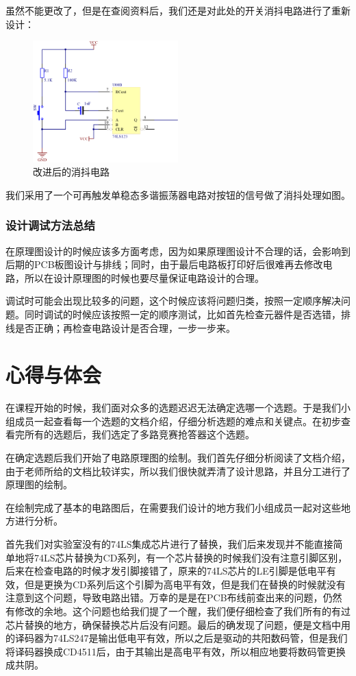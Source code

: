 \documentclass{../source/Experiment}
\begin{document}
            虽然不能更改了，但是在查阅资料后，我们还是对此处的开关消抖电路进行了重新设计：
            \begin{figure}[H]
                \centering
                \includegraphics[width = 0.5\textwidth]{pic/消抖.png}
                \caption{改进后的消抖电路}
            \end{figure}
            我们采用了一个可再触发单稳态多谐振荡器电路对按钮的信号做了消抖处理如图。
            \subsubsection{设计调试方法总结}
            在原理图设计的时候应该多方面考虑，因为如果原理图设计不合理的话，会影响到后期的PCB板图设计与排线；同时，由于最后电路板打印好后很难再去修改电路，所以在设计原理图的时候也要尽量保证电路设计的合理。
            
            调试时可能会出现比较多的问题，这个时候应该将问题归类，按照一定顺序解决问题。同时调试的时候应该按照一定的顺序测试，比如首先检查元器件是否选错，排线是否正确；再检查电路设计是否合理，一步一步来。
    \section{心得与体会}
        在课程开始的时候，我们面对众多的选题迟迟无法确定选哪一个选题。于是我们小组成员一起查看每一个选题的文档介绍，仔细分析选题的难点和关键点。在初步查看完所有的选题后，我们选定了多路竞赛抢答器这个选题。

        在确定选题后我们开始了电路原理图的绘制。我们首先仔细分析阅读了文档介绍，由于老师所给的文档比较详实，所以我们很快就弄清了设计思路，并且分工进行了原理图的绘制。

        在绘制完成了基本的电路图后，在需要我们设计的地方我们小组成员一起对这些地方进行分析。
        
        首先我们对实验室没有的74LS集成芯片进行了替换，我们后来发现并不能直接简单地将74LS芯片替换为CD系列，有一个芯片替换的时候我们没有注意引脚区别，后来在检查电路的时候才发引脚接错了，原来的74LS芯片的LE引脚是低电平有效，但是更换为CD系列后这个引脚为高电平有效，但是我们在替换的时候就没有注意到这个问题，导致电路出错。万幸的是是在PCB布线前查出来的问题，仍然有修改的余地。这个问题也给我们提了一个醒，我们便仔细检查了我们所有的有过芯片替换的地方，确保替换芯片后没有问题。最后的确发现了问题，便是文档中用的译码器为74LS247是输出低电平有效，所以之后是驱动的共阳数码管，但是我们将译码器换成CD4511后，由于其输出是高电平有效，所以相应地要将数码管更换成共阴。
\end{document}
